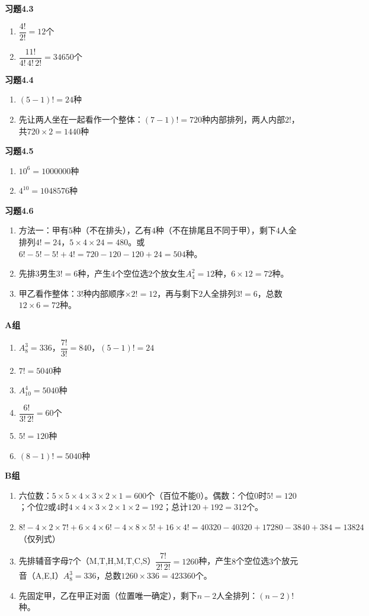 \textbf{习题4.3}
\begin{enumerate}
\item $\dfrac{4!}{2!}=12$个
\item $\dfrac{11!}{4!\,4!\,2!}=34650$个
\end{enumerate}

\textbf{习题4.4}
\begin{enumerate}
\item $(5-1)!=24$种
\item 先让两人坐在一起看作一个整体：$(7-1)! = 720$种内部排列，两人内部$2!$，共$720\times2=1440$种
\end{enumerate}

\textbf{习题4.5}
\begin{enumerate}
\item $10^6=1000000$种
\item $4^{10}=1048576$种
\end{enumerate}

\textbf{习题4.6}
\begin{enumerate}
\item 方法一：甲有$5$种（不在排头），乙有$4$种（不在排尾且不同于甲），剩下$4$人全排列$4!=24$，$5\times4\times24=480$。或$6!-5!-5!+4!=720-120-120+24=504$种。
\item 先排$3$男生$3!=6$种，产生$4$个空位选$2$个放女生$A_4^2=12$种，$6\times12=72$种。
\item 甲乙看作整体：$3!$种内部顺序$\times2!=12$，再与剩下$2$人全排列$3!=6$，总数$12\times6=72$种。
\end{enumerate}

\textbf{A组}
\begin{enumerate}
\item $A_8^3=336$，$\dfrac{7!}{3!}=840$，$(5-1)!=24$
\item $7!=5040$种
\item $A_{10}^4=5040$种
\item $\dfrac{6!}{3!\,2!}=60$个
\item $5!=120$种
\item $(8-1)!=5040$种
\end{enumerate}

\textbf{B组}
\begin{enumerate}
\item 六位数：$5\times5\times4\times3\times2\times1=600$个（百位不能$0$）。偶数：个位$0$时$5!=120$；个位$2$或$4$时$4\times4\times3\times2\times1\times2=192$；总计$120+192=312$个。
\item $8!-4\times2\times7!+6\times4\times6!-4\times8\times5!+16\times4!=40320-40320+17280-3840+384=13824$（仅列式）
\item 先排辅音字母$7$个（M,T,H,M,T,C,S）$\dfrac{7!}{2!\,2!}=1260$种，产生$8$个空位选$3$个放元音（A,E,I）$A_8^3=336$，总数$1260\times336=423360$个。
\item 先固定甲，乙在甲正对面（位置唯一确定），剩下$n-2$人全排列：$(n-2)!$种。
\end{enumerate}


